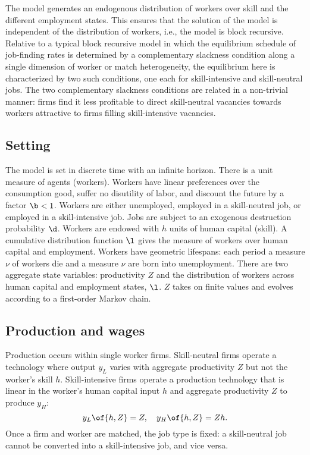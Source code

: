 \documentclass[12pt]{article}
\newcommand{\highlightP}[1]{{\emph{\color{MyPink}{#1}}}}
\theoremstyle{definition}
\begin{document}
The model generates an endogenous distribution of workers over skill and the different employment states. \highlightP{But the model remains tractable, in part because firms are restricted to direct any particular vacancy towards a single level of skill.} This ensures that the solution of the model is independent of the distribution of workers, i.e., the model is block recursive. Relative to a typical block recursive model in which the equilibrium schedule of job-finding rates is determined by a complementary slackness condition along a single dimension of worker or match heterogeneity, the equilibrium here is characterized by two such conditions, one each for skill-intensive and skill-neutral jobs. The two complementary slackness conditions are related in a non-trivial manner: firms find it less profitable to direct skill-neutral vacancies towards workers attractive to firms filling skill-intensive vacancies. 

\subsection{Setting}

The model is set in discrete time with an infinite horizon. There is a unit measure of agents (workers). Workers have linear preferences over the consumption good, suffer no disutility of labor, and discount the future by a factor $\b < 1$. Workers are either unemployed, employed in a skill-neutral job, or employed in a skill-intensive job. Jobs are subject to an exogenous destruction probability $\d$. Workers are endowed with $h$ units of human capital (skill). A cumulative distribution function $\l$ gives the measure of workers over human capital and employment. Workers have geometric lifespans: each period a measure $\nu$ of workers die and a measure $\nu$ are born into unemployment. There are two aggregate state variables: productivity $Z$ and the distribution of workers across human capital and employment states, $\l$. $Z$ takes on finite values and evolves according to a first-order Markov chain. 

\subsection{Production and wages}
\setcounter{equation}{2}

Production occurs within single worker firms. Skill-neutral firms operate a technology where output $y_L$ varies with aggregate productivity $Z$ but not the worker's skill $h$. Skill-intensive firms operate a production technology that is linear in the worker's human capital input $h$ and aggregate productivity $Z$ to produce $y_H$:
\begin{equation}
    \label{3}
    y_L\of{h, Z} = Z, \quad y_H\of{h, Z} = Z h. 
\end{equation}
Once a firm and worker are matched, the job type is fixed: a skill-neutral job cannot be converted into a skill-intensive job, and vice versa.
\end{document}

